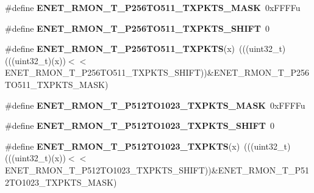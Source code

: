\begin{DoxyCompactItemize}
\item 
\#define {\bfseries E\+N\+E\+T\+\_\+\+R\+M\+O\+N\+\_\+\+T\+\_\+\+P256\+T\+O511\+\_\+\+T\+X\+P\+K\+T\+S\+\_\+\+M\+A\+SK}~0x\+F\+F\+F\+Fu\hypertarget{group__ENET__Register__Masks_ga85bc090787f3d1078d6f9181f4bbb671}{}\label{group__ENET__Register__Masks_ga85bc090787f3d1078d6f9181f4bbb671}

\item 
\#define {\bfseries E\+N\+E\+T\+\_\+\+R\+M\+O\+N\+\_\+\+T\+\_\+\+P256\+T\+O511\+\_\+\+T\+X\+P\+K\+T\+S\+\_\+\+S\+H\+I\+FT}~0\hypertarget{group__ENET__Register__Masks_gae24403acde1f82a26d37e32743c259cf}{}\label{group__ENET__Register__Masks_gae24403acde1f82a26d37e32743c259cf}

\item 
\#define {\bfseries E\+N\+E\+T\+\_\+\+R\+M\+O\+N\+\_\+\+T\+\_\+\+P256\+T\+O511\+\_\+\+T\+X\+P\+K\+TS}(x)~(((uint32\+\_\+t)(((uint32\+\_\+t)(x))$<$$<$E\+N\+E\+T\+\_\+\+R\+M\+O\+N\+\_\+\+T\+\_\+\+P256\+T\+O511\+\_\+\+T\+X\+P\+K\+T\+S\+\_\+\+S\+H\+I\+FT))\&E\+N\+E\+T\+\_\+\+R\+M\+O\+N\+\_\+\+T\+\_\+\+P256\+T\+O511\+\_\+\+T\+X\+P\+K\+T\+S\+\_\+\+M\+A\+SK)\hypertarget{group__ENET__Register__Masks_gab00f7d9c011f220e5022eda482c3d411}{}\label{group__ENET__Register__Masks_gab00f7d9c011f220e5022eda482c3d411}

\item 
\#define {\bfseries E\+N\+E\+T\+\_\+\+R\+M\+O\+N\+\_\+\+T\+\_\+\+P512\+T\+O1023\+\_\+\+T\+X\+P\+K\+T\+S\+\_\+\+M\+A\+SK}~0x\+F\+F\+F\+Fu\hypertarget{group__ENET__Register__Masks_gaf14272bdf0f12949bf600b571553adcb}{}\label{group__ENET__Register__Masks_gaf14272bdf0f12949bf600b571553adcb}

\item 
\#define {\bfseries E\+N\+E\+T\+\_\+\+R\+M\+O\+N\+\_\+\+T\+\_\+\+P512\+T\+O1023\+\_\+\+T\+X\+P\+K\+T\+S\+\_\+\+S\+H\+I\+FT}~0\hypertarget{group__ENET__Register__Masks_ga4a580b8a12cf238b78636beddc069555}{}\label{group__ENET__Register__Masks_ga4a580b8a12cf238b78636beddc069555}

\item 
\#define {\bfseries E\+N\+E\+T\+\_\+\+R\+M\+O\+N\+\_\+\+T\+\_\+\+P512\+T\+O1023\+\_\+\+T\+X\+P\+K\+TS}(x)~(((uint32\+\_\+t)(((uint32\+\_\+t)(x))$<$$<$E\+N\+E\+T\+\_\+\+R\+M\+O\+N\+\_\+\+T\+\_\+\+P512\+T\+O1023\+\_\+\+T\+X\+P\+K\+T\+S\+\_\+\+S\+H\+I\+FT))\&E\+N\+E\+T\+\_\+\+R\+M\+O\+N\+\_\+\+T\+\_\+\+P512\+T\+O1023\+\_\+\+T\+X\+P\+K\+T\+S\+\_\+\+M\+A\+SK)\hypertarget{group__ENET__Register__Masks_ga22c752d3df4c9638eae841367dcd8e04}{}\label{group__ENET__Register__Masks_ga22c752d3df4c9638eae841367dcd8e04}


\end{DoxyCompactItemize}
